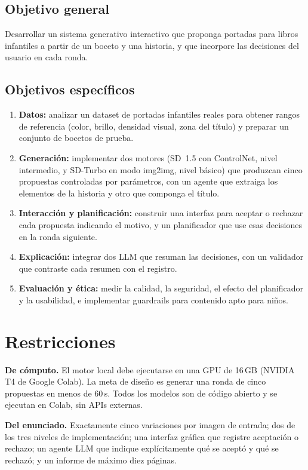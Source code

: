 \documentclass[10pt,a4paper,twocolumn]{article}
\begin{document}
\subsection{Objetivo general}
Desarrollar un sistema generativo interactivo que proponga portadas para libros infantiles a partir de un boceto y una historia, y que incorpore las decisiones del usuario en cada ronda.

\subsection{Objetivos específicos}
\begin{enumerate}
\item \textbf{Datos:} analizar un dataset de portadas infantiles reales para obtener rangos de referencia (color, brillo, densidad visual, zona del título) y preparar un conjunto de bocetos de prueba.
\item \textbf{Generación:} implementar dos motores (SD~1.5 con ControlNet, nivel intermedio, y SD-Turbo en modo img2img, nivel básico) que produzcan cinco propuestas controladas por parámetros, con un agente que extraiga los elementos de la historia y otro que componga el título.
\item \textbf{Interacción y planificación:} construir una interfaz para aceptar o rechazar cada propuesta indicando el motivo, y un planificador que use esas decisiones en la ronda siguiente.
\item \textbf{Explicación:} integrar dos LLM que resuman las decisiones, con un validador que contraste cada resumen con el registro.
\item \textbf{Evaluación y ética:} medir la calidad, la seguridad, el efecto del planificador y la usabilidad, e implementar guardrails para contenido apto para niños.
\end{enumerate}

\section{Restricciones}
\textbf{De cómputo.} El motor local debe ejecutarse en una GPU de 16\,GB (NVIDIA T4 de Google Colab). La meta de diseño es generar una ronda de cinco propuestas en menos de 60\,s. Todos los modelos son de código abierto y se ejecutan en Colab, sin APIs externas.

\textbf{Del enunciado.} Exactamente cinco variaciones por imagen de entrada; dos de los tres niveles de implementación; una interfaz gráfica que registre aceptación o rechazo; un agente LLM que indique explícitamente qué se aceptó y qué se rechazó; y un informe de máximo diez páginas.
\end{document}
